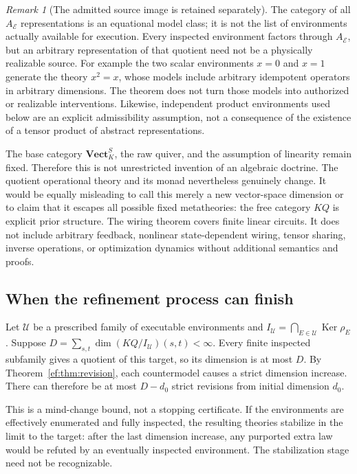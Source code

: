 \documentclass[11pt]{article}
\theoremstyle{definition}
\theoremstyle{remark}\newtheorem{remark}[theorem]{Remark}
\newcommand{\Ker}{\operatorname{Ker}}
\begin{document}
\begin{remark}[The admitted source image is retained separately]
The category of all $A_{\mathcal E}$ representations is an equational
model class; it is not the list of environments actually available for
execution. Every inspected environment factors through $A_{\mathcal E}$,
but an arbitrary representation of that quotient need not be a physically
realizable source. For example the two scalar environments $x=0$ and
$x=1$ generate the theory $x^2=x$, whose models include arbitrary
idempotent operators in arbitrary dimensions. The theorem does not turn
those models into authorized or realizable interventions. Likewise,
independent product environments used below are an explicit admissibility
assumption, not a consequence of the existence of a tensor product of
abstract representations.
\end{remark}

The base category $\mathbf{Vect}_K^S$, the raw quiver, and the assumption of
linearity remain fixed. Therefore this is not unrestricted invention of
an algebraic doctrine. The quotient operational theory and its monad
nevertheless genuinely change. It would be equally misleading to call
this merely a new vector-space dimension or to claim that it escapes all
possible fixed metatheories: the free category $KQ$ is explicit prior
structure. The wiring theorem covers finite linear circuits. It does
not include arbitrary feedback, nonlinear state-dependent wiring, tensor
sharing, inverse operations, or optimization dynamics without additional
semantics and proofs.



\subsection{When the refinement process can finish}
Let $\mathcal U$ be a prescribed family of executable environments and
$I_{\mathcal U}=\bigcap_{E\in\mathcal U}\Ker\rho_E$. Suppose
$D=\sum_{s,t}\dim(KQ/I_{\mathcal U})(s,t)<\infty$. Every finite inspected
subfamily gives a quotient of this target, so its dimension is at most $D$.
By Theorem~\ref{ef:thm:revision}, each countermodel causes a strict dimension
increase. There can therefore be at most $D-d_0$ strict revisions from
initial dimension $d_0$.

This is a mind-change bound, not a stopping certificate. If the environments
are effectively enumerated and fully inspected, the resulting theories
stabilize in the limit to the target: after the last dimension increase,
any purported extra law would be refuted by an eventually inspected
environment. The stabilization stage need not be recognizable.
\end{document}
